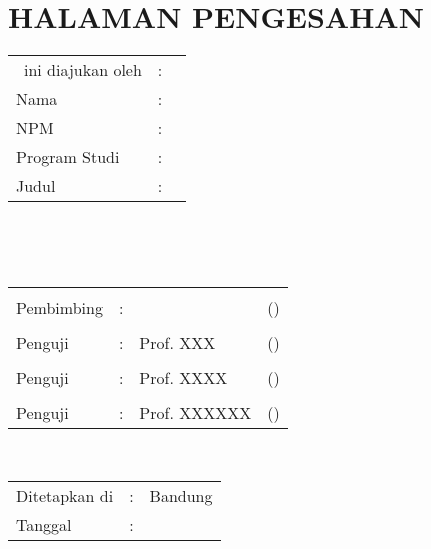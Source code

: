 %
%
%

\chapter*{HALAMAN PENGESAHAN}

\vspace*{0.4cm}
\noindent 

\noindent
\begin{tabular}{ll p{9cm}}
	\type~ini diajukan oleh&: & \\
	Nama&: & \penulis \\
	NPM&: & \npm \\
	Program Studi&: & \program \\
	Judul \type&: & \judul \\
\end{tabular} \\

\vspace*{1.0cm}

\noindent {}\\[0.2cm]

\begin{center}
\end{center}

\vspace*{0.3cm}

\begin{tabular}{l l l l }
	& & & \\
	Pembimbing&: & \pembimbing & (\hspace*{3.0cm}) \\
	& & & \\
	Penguji&: & Prof. XXX & (\hspace*{3.0cm}) \\
	& & & \\
	Penguji&: & Prof. XXXX & (\hspace*{3.0cm}) \\
	& & & \\
	Penguji&: & Prof. XXXXXX & (\hspace*{3.0cm}) \\
\end{tabular}\\


\vspace*{2.0cm}

\begin{tabular}{ll l}
	Ditetapkan di&: & Bandung\\
	Tanggal&: & \tanggalLulus \\
\end{tabular}


\newpage